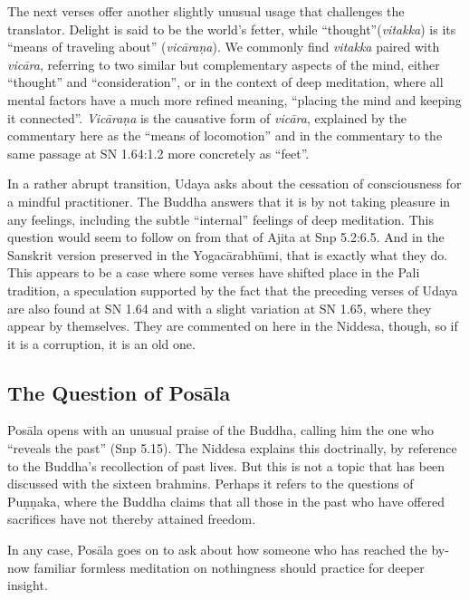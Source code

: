 \documentclass[12pt,openany]{book}%
\begin{document}
The next verses offer another slightly unusual usage that challenges the translator. Delight is said to be the world’s fetter, while “thought”(\textit{vitakka}) is its “means of traveling about” (\textit{\textsanskrit{vicāraṇa}}). We commonly find \textit{vitakka} paired with \textit{\textsanskrit{vicāra}}, referring to two similar but complementary aspects of the mind, either “thought” and “consideration”, or in the context of deep meditation, where all mental factors have a much more refined meaning, “placing the mind and keeping it connected”. \textit{\textsanskrit{Vicāraṇa}} is the causative form of \textit{\textsanskrit{vicāra}}, explained by the commentary here as the “means of locomotion” and in the commentary to the same passage at SN 1.64:1.2 more concretely as “feet”.

In a rather abrupt transition, Udaya asks about the cessation of consciousness for a mindful practitioner. The Buddha answers that it is by not taking pleasure in any feelings, including the subtle “internal” feelings of deep meditation. This question would seem to follow on from that of Ajita at Snp 5.2:6.5. And in the Sanskrit version preserved in the \textsanskrit{Yogacārabhūmi}, that is exactly what they do. This appears to be a case where some verses have shifted place in the Pali tradition, a speculation supported by the fact that the preceding verses of Udaya are also found at SN 1.64 and with a slight variation at SN 1.65, where they appear by themselves. They are commented on here in the Niddesa, though, so if it is a corruption, it is an old one.

\subsection*{The Question of \textsanskrit{Posāla}}

\textsanskrit{Posāla} opens with an unusual praise of the Buddha, calling him the one who “reveals the past” (Snp 5.15). The Niddesa explains this doctrinally, by reference to the Buddha’s recollection of past lives. But this is not a topic that has been discussed with the sixteen brahmins. Perhaps it refers to the questions of \textsanskrit{Puṇṇaka}, where the Buddha claims that all those in the past who have offered sacrifices have not thereby attained freedom.

In any case, \textsanskrit{Posāla} goes on to ask about how someone who has reached the by-now familiar formless meditation on nothingness should practice for deeper insight.
\end{document}
